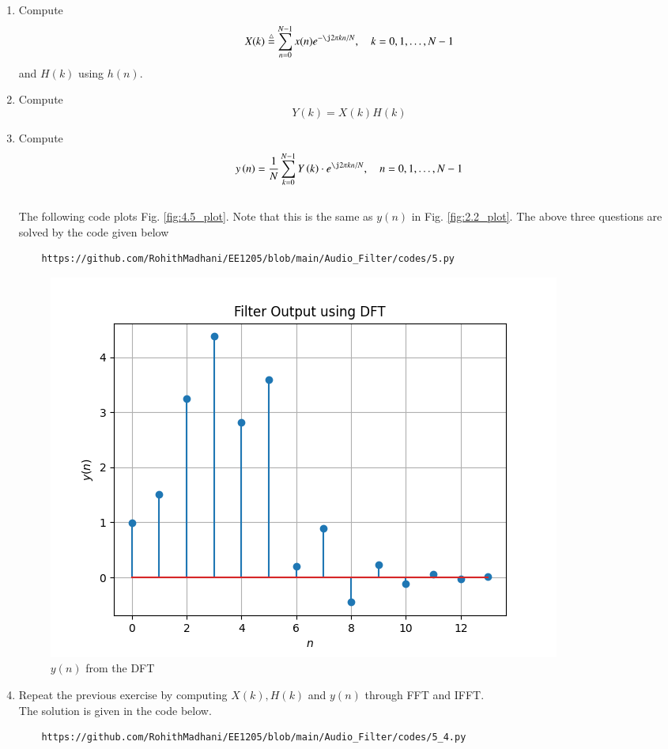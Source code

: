 \documentclass[journal,12pt,twocolumn]{IEEEtran}
\newcommand{\define}{\stackrel{\triangle}{=}}
\theoremstyle{remark}
\begin{document}
\begin{enumerate}[label=\thesection.\arabic*]
\item
Compute
\begin{equation}
X(k) \define \sum _{n=0}^{N-1}x(n) e^{-\j2\pi kn/N}, \quad k = 0,1,\dots, N-1
\end{equation}
and $H(k)$ using $h(n)$.
\item Compute 
\begin{equation}
\label{eq:fp}
Y(k) = X(k)H(k)
\end{equation}
\item Compute
\begin{equation}
 y\brak{n}={\frac {1}{N}}\sum _{k=0}^{N-1}Y\brak{k}\cdot e^{\j 2\pi kn/N},\quad n = 0,1,\dots, N-1
\end{equation}
\\
\solution The following code plots Fig. \ref{fig:4.5_plot}. Note that this is the same as 
$y(n)$ in  Fig. 
\ref{fig:2.2_plot}. The above three questions are solved by the code given below
%
\begin{lstlisting}
    https://github.com/RohithMadhani/EE1205/blob/main/Audio_Filter/codes/5.py
\end{lstlisting}
\begin{figure}[H]
    \centering
    \includegraphics[width=\columnwidth]{figs/5.png}
    \caption{$y(n)$ from the DFT}
    \label{fig:5_plot}
\end{figure}

\item Repeat the previous exercise by computing $X(k), H(k)$ and $y(n)$ through FFT and IFFT.\\
\solution The solution is given in the code below.
\begin{lstlisting}
    https://github.com/RohithMadhani/EE1205/blob/main/Audio_Filter/codes/5_4.py
\end{lstlisting}


\end{enumerate}
\end{document}
